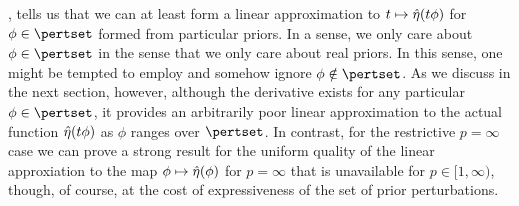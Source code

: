 , tells us that we can at least form a linear
approximation to $t \mapsto \hat\eta(t \phi)$ for $\phi \in \pertset$ formed
from particular priors.  In a sense, we only care about $\phi \in \pertset$ in
the sense that we only care about real priors.  In this sense, one might be
tempted to employ  and somehow ignore $\phi \notin
\pertset$.  As we discuss in the next section, however, although the derivative
exists for any particular $\phi \in \pertset$, it provides an arbitrarily poor
linear approximation to the actual function $\hat\eta(t \phi)$ as $\phi$ ranges
over $\pertset$.  In contrast, for the restrictive $p=\infty$ case we can prove
a strong result for the uniform quality of the linear approxiation to the  map
$\phi \mapsto \hat\eta(\phi)$ for $p = \infty$ that is unavailable for $p \in [1,
\infty)$, though, of course, at the cost of expressiveness of the set of prior
perturbations.
